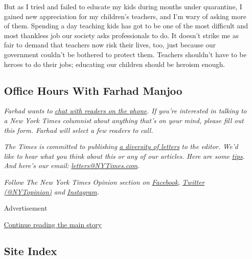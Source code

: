 But as I tried and failed to educate my kids during months under
quarantine, I gained new appreciation for my children's teachers, and
I'm wary of asking more of them. Spending a day teaching kids has got to
be one of the most difficult and most thankless job our society asks
professionals to do. It doesn't strike me as fair to demand that
teachers now risk their lives, too, just because our government couldn't
be bothered to protect them. Teachers shouldn't have to be heroes to do
their jobs; educating our children should be heroism enough.

\hypertarget{office-hours-with-farhad-manjoo}{%
\subsection{Office Hours With Farhad
Manjoo}\label{office-hours-with-farhad-manjoo}}

\emph{Farhad wants to}
\href{https://www.nytimes3xbfgragh.onion/2019/05/16/opinion/farhad-office-hours.html?module=inline}{\emph{chat
with readers on the phone}}\emph{. If you're interested in talking to a
New York Times columnist about anything that's on your mind, please fill
out this form. Farhad will select a few readers to call.}

\emph{The Times is committed to publishing}
\href{https://www.nytimes3xbfgragh.onion/2019/01/31/opinion/letters/letters-to-editor-new-york-times-women.html}{\emph{a
diversity of letters}} \emph{to the editor. We'd like to hear what you
think about this or any of our articles. Here are some}
\href{https://help.nytimes3xbfgragh.onion/hc/en-us/articles/115014925288-How-to-submit-a-letter-to-the-editor}{\emph{tips}}\emph{.
And here's our email:}
\href{mailto:letters@NYTimes.com}{\emph{letters@NYTimes.com}}\emph{.}

\emph{Follow The New York Times Opinion section on}
\href{https://www.facebookcorewwwi.onion/nytopinion}{\emph{Facebook}}\emph{,}
\href{http://twitter.com/NYTOpinion}{\emph{Twitter (@NYTopinion)}}
\emph{and}
\href{https://www.instagram.com/nytopinion/}{\emph{Instagram}}\emph{.}

Advertisement

\protect\hyperlink{after-bottom}{Continue reading the main story}

\hypertarget{site-index}{%
\subsection{Site Index}\label{site-index}}


